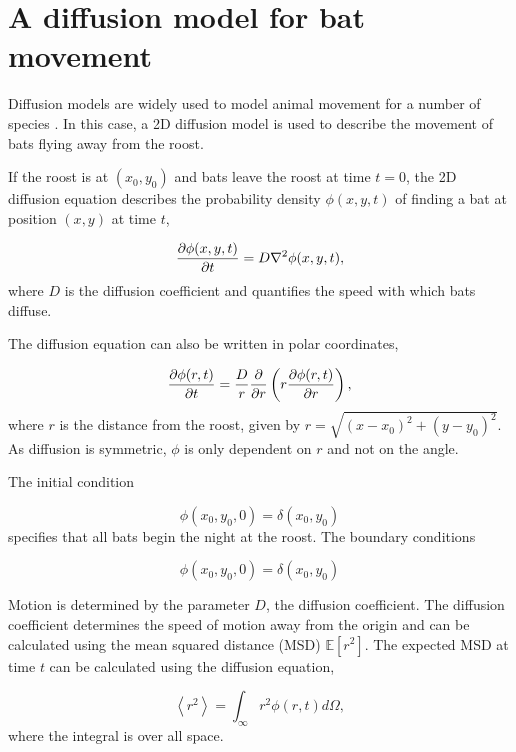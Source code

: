 \section{A diffusion model for bat movement}

Diffusion models are widely used to model animal movement for a number of species \cite{Ovaskainen2016}. In this case, a 2D diffusion model is used to describe the movement of bats flying away from the roost.

If the roost is at $(x_0,y_0)$ and bats leave the roost at time $t =0$,
the 2D diffusion equation describes the probability density $\phi(x,y,t)$ of
finding a bat at position $(x,y)$ at time $t$,

\begin{equation}
  \frac{\partial \phi(x,y,t)}{\partial  t} = D \nabla^2 \phi(x,y,t) ,
  \nonumber
\end{equation}
%
where $D$ is the diffusion coefficient and quantifies the speed with which bats diffuse.

The diffusion equation can also be written in polar coordinates,

\begin{equation}
\frac{\partial  \phi(r,t)}{\partial t} = \frac{D}{r} \frac{\partial }{\partial  r} \left( r \frac{\partial \phi(r,t)}{\partial r} \right),
\end{equation}
%
where $r$ is the distance from the roost, given by $r=\sqrt{(x-x_0)^2 + (y-y_0)^2}$. As diffusion is symmetric, $\phi$ is only dependent on $r$ and not on the angle.

The initial condition

\begin{equation}
\phi(x_0,y_0,0) = \delta(x_0,y_0)
\label{eqn:IC}
\end{equation}
%
specifies that all bats begin the night at the roost. The boundary conditions

\begin{equation}
\phi(x_0,y_0,0) = \delta(x_0,y_0)
\label{eqn:IC}
\end{equation}

Motion is determined by the parameter $D$, the diffusion coefficient. The diffusion coefficient determines the speed of motion away from the origin and can be calculated using the mean squared distance (MSD) $\mathbb{E}[r^2]$. The expected MSD at time $t$ can be calculated using the diffusion equation,

\begin{equation}
\left<r^2\right> = \int_{\infty}r^2 \phi(r,t) d\Omega ,
\end{equation}
%
where the integral is over all space.

